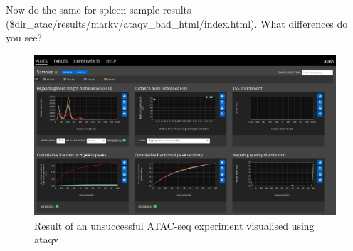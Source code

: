 \documentclass[12pt]{article}
\begin{document}
			Now do the same for spleen sample results (\$dir\_atac/results/markv/ataqv\_bad\_html/index.html). 
			What differences do you see?
			
			\begin{figure}[H]
				\includegraphics[width=\textwidth]{ataqv_bad.png}
				\caption{Result of an unsuccessful  ATAC-seq experiment visualised using ataqv}
				\label{fig:ataqv_bad}
			\end{figure}
	

	
\end{document}
